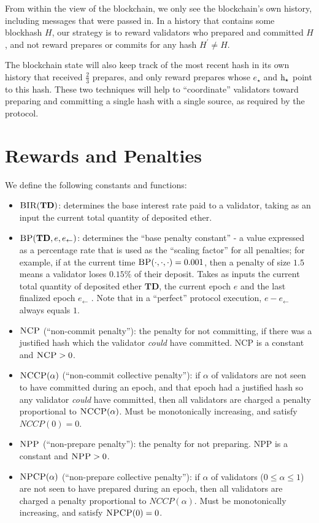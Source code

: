 \documentclass[12pt, final]{article}
\newcommand{\epoch}{\ensuremath{e}}
\newcommand{\hash}{\textnormal{h}}
\newcommand{\hashsource}{\hash_{\star}\xspace}
\newcommand{\epochsource}{\epoch_{\star}\xspace}
\newcommand{\BIR}{\textsc{BIR}\xspace}
\newcommand{\BP}{\textsc{BP}\xspace}
\newcommand{\NCP}{\textsc{NCP}\xspace}
\newcommand{\NCCP}{\textsc{NCCP}\xspace}
\newcommand{\NPP}{\textsc{NPP}\xspace}
\newcommand{\NPCP}{\textsc{NPCP}\xspace}
\newcommand{\totaldeposit}{ \textbf{TD} \xspace}
\newcommand{\LFE}{ \ensuremath{\epoch_{\leftarrow}} \xspace}
\begin{document}
From within the view of the blockchain, we only see the blockchain's own history, including messages that were passed in. In a history that contains some blockhash $H$, our strategy is to reward validators who prepared and committed $H$, and not reward prepares or commits for any hash $H^\prime \ne H$.

The blockchain state will also keep track of the most recent hash in its own history that received $\frac{2}{3}$ prepares, and only reward prepares whose $\epochsource$ and $\hashsource$ point to this hash. These two techniques will help to ``coordinate'' validators toward preparing and committing a single hash with a single source, as required by the protocol.

\section{Rewards and Penalties}

We define the following constants and functions:

\begin{itemize}
\item $\BIR(\totaldeposit)$: determines the base interest rate paid to a validator, taking as an input the current total quantity of deposited ether.

\item $\BP(\totaldeposit, e, \LFE )$: determines the ``base penalty constant'' - a value expressed as a percentage rate that is used as the ``scaling factor'' for all penalties; for example, if at the current time $\BP(\cdot, \cdot, \cdot) = 0.001$, then a penalty of size $1.5$ means a validator loses $0.15\%$ of their deposit. Takes as inputs the current total quantity of deposited ether $\totaldeposit$, the current epoch $e$ and the last finalized epoch \LFE. Note that in a ``perfect'' protocol execution, $\epoch - \LFE$ always equals $1$.

\item $\NCP$ (``non-commit penalty''): the penalty for not committing, if there was a justified hash which the validator \emph{could} have committed.  \NCP is a constant and $\NCP > 0$.

\item $\NCCP(\alpha)$ (``non-commit collective penalty''): if $\alpha$ of validators are not seen to have committed during an epoch, and that epoch had a justified hash so any validator \emph{could} have committed, then all validators are charged a penalty proportional to $\NCCP(\alpha)$. Must be monotonically increasing, and satisfy $NCCP(0) = 0$.

\item $\NPP$ (``non-prepare penalty''): the penalty for not preparing. \NPP is a constant and $\NPP > 0$.

\item $\NPCP(\alpha)$ (``non-prepare collective penalty''): if $\alpha$ of validators ($0 \leq \alpha \leq 1$) are not seen to have prepared during an epoch, then all validators are charged a penalty proportional to $NCCP(\alpha)$. Must be monotonically increasing, and satisfy $\NPCP(0) = 0$.

\end{itemize}
\end{document}
